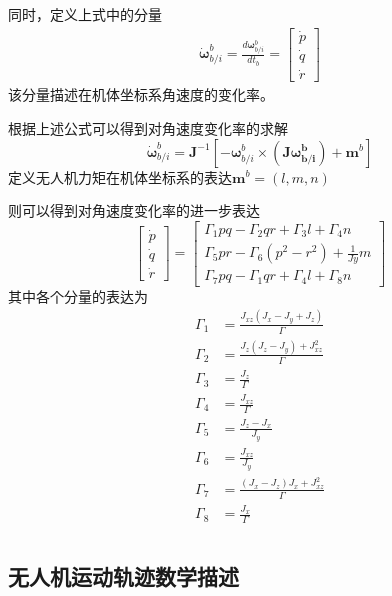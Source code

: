 同时，定义上式中的分量
\begin{align}
	\dot{\mathbf{\omega}}^b_{b/i}=\frac{ d \mathbf{\omega}^b_{b/i}}{dt_b} = \begin{bmatrix} \dot{p} \\ \dot{q} \\ \dot{r}  \end{bmatrix}
\end{align}
该分量描述在机体坐标系角速度的变化率。

根据上述公式可以得到对角速度变化率的求解
\begin{equation}
	\dot{\mathbf{\omega}}^b_{b/i} = \mathbf{J}^{-1}[{- \mathbf{\omega}}^b_{b/i} \times (\mathbf{J{\mathbf{\omega}}^b_{b/i}})+\mathbf{m}^b]
\end{equation}
定义无人机力矩在机体坐标系的表达$\mathbf{m}^b = (l, m, n)$

则可以得到对角速度变化率的进一步表达
\begin{equation}
	\begin{bmatrix} \dot{p} \\ \dot{q} \\ \dot{r}  \end{bmatrix} =  \begin{bmatrix} \Gamma_1pq - \Gamma_2qr + \Gamma_3 l + \Gamma_4 n \\ \Gamma_5pr - \Gamma_6(p^2-r^2) + \frac{1}{Jy}m \\ \Gamma_7pq - \Gamma_1qr + \Gamma_4l + \Gamma_8 n  \end{bmatrix}
\end{equation}
其中各个分量的表达为
\begin{align}
	\Gamma_1 &= \frac{J_{xz}(J_x-J_y+J_z)}{\Gamma}  \\
	\Gamma_2 &= \frac{J_z(J_z-J_y) + J_{xz}^2}{\Gamma}  \\
	\Gamma_3 &= \frac{J_z}{\Gamma}  \\
	\Gamma_4 &= \frac{J_{xz}}{\Gamma}  \\
	\Gamma_5 &= \frac{J_z - J_x}{J_y}  \\
	\Gamma_6 &= \frac{J_{xz}}{J_y}  \\
	\Gamma_7 &= \frac{(J_x-J_z)J_x+J_{xz}^2}{\Gamma}  \\
	\Gamma_8 &= \frac{J_x}{\Gamma}  \\
\end{align}

\subsection{无人机运动轨迹数学描述}

